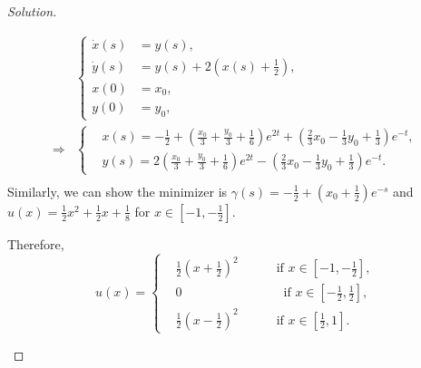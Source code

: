 \documentclass[english,reqno]{amsart}
\newenvironment{solution}
  {\renewcommand\qedsymbol{$\blacksquare$}\begin{proof}[Solution]}
  {\end{proof}}
\begin{document}
\begin{enumerate}[label=\arabic*)]
\begin{solution}
\begin{itemize}
\begin{enumerate}
\begin{equation*}
\begin{aligned}
 &\left\{
\begin{aligned}
\dot{x}(s)&=y(s),\\
     \dot{y}(s)&=y(s) + 2\left(x(s)+\frac{1}{2}\right),\\
     x(0)&=x_0,\\
     y(0)&=y_0,
\end{aligned}
\right.\\
\Longrightarrow &
\left\{
    \begin{aligned}
         	& x(s)=-\frac{1}{2}+\left(\frac{x_0}{3}+\frac{y_0}{3}+\frac{1}{6}\right)e^{2t} + \left( \frac{2}{3}x_0-\frac{1}{3}y_0+\frac{1}{3}\right) e^{-t},\\
         	& y(s)=2\left(\frac{x_0}{3}+\frac{y_0}{3}+\frac{1}{6}\right)e^{2t} - \left( \frac{2}{3}x_0-\frac{1}{3}y_0+\frac{1}{3}\right) e^{-t}.
    \end{aligned}
\right.\\
\end{aligned}
\end{equation*}
Similarly, we can show the minimizer is $\displaystyle \gamma(s)=-\frac{1}{2}+\left(x_0+\frac{1}{2}\right)e^{-s}$ and $\displaystyle u(x)=\frac{1}{2}x^2+\frac{1}{2}x+\frac{1}{8}$ for $x \in \left[-1, -\frac{1}{2}\right]$.
\end{enumerate}
Therefore, 
\begin{equation*}
u(x)=\left\{
    \begin{aligned}
      &\frac{1}{2}\left(x+\frac{1}{2}\right)^2  \quad \qquad \text{if }x \in \left[-1, -\frac{1}{2}\right],\\
     &0 \qquad \qquad \qquad \qquad \text{if } x \in \left[-\frac{1}{2}, \frac{1}{2}\right],\\
   &\frac{1}{2}\left(x-\frac{1}{2}\right)^2 \quad \qquad \text{if } x \in \left[\frac{1}{2}, 1\right].
    \end{aligned}
\right.
\end{equation*}

\vspace{2em}


\end{itemize}
\end{solution}
\end{enumerate}
\end{document}
